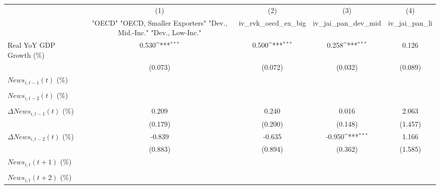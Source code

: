 {
\def\sym#1{\ifmmode^{#1}\else\(^{#1}\)\fi}
\begin{tabular}{l*{4}{c}}
\toprule
                    &\multicolumn{1}{c}{(1)}&\multicolumn{1}{c}{(2)}&\multicolumn{1}{c}{(3)}&\multicolumn{1}{c}{(4)}\\
                    &\multicolumn{1}{c}{ "OECD" "OECD, Smaller Exporters" "Dev., Mid.-Inc." "Dev., Low-Inc."}&\multicolumn{1}{c}{iv_rvk_oecd_ex_big}&\multicolumn{1}{c}{iv_jai_pan_dev_mid}&\multicolumn{1}{c}{iv_jai_pan_li}\\
\midrule
Real YoY GDP Growth (\%)&       0.530\sym{***}&       0.500\sym{***}&       0.258\sym{***}&       0.126         \\
                    &     (0.073)         &     (0.072)         &     (0.032)         &     (0.089)         \\
\addlinespace
$ News_{i,t-1}(t)$ (\%)&                     &                     &                     &                     \\
                    &                     &                     &                     &                     \\
\addlinespace
$ News_{i,t-2}(t)$ (\%)&                     &                     &                     &                     \\
                    &                     &                     &                     &                     \\
\addlinespace
$ \Delta News_{i,t-1}(t)$ (\%)&       0.209         &       0.240         &       0.016         &       2.063         \\
                    &     (0.179)         &     (0.200)         &     (0.148)         &     (1.457)         \\
\addlinespace
$ \Delta News_{i,t-2}(t)$ (\%)&      -0.839         &      -0.635         &      -0.950\sym{***}&       1.166         \\
                    &     (0.883)         &     (0.894)         &     (0.362)         &     (1.585)         \\
\addlinespace
$ News_{i,t}(t+1)$ (\%)&                     &                     &                     &                     \\
                    &                     &                     &                     &                     \\
\addlinespace
$ News_{i,t}(t+2)$ (\%)&                     &                     &                     &                     \\

\end{tabular}}
